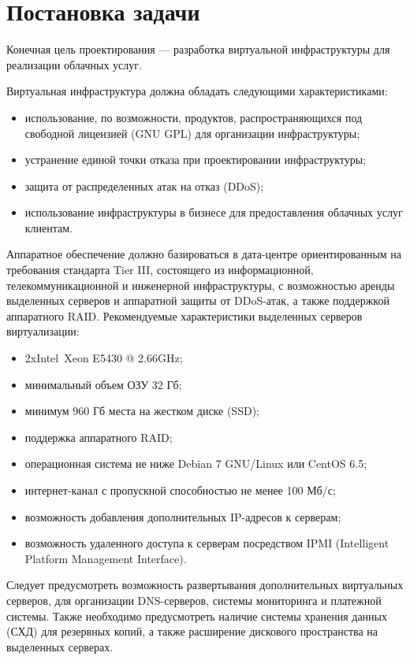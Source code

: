 \section{Постановка задачи}

Конечная цель проектирования --- разработка виртуальной инфраструктуры для реализации облачных услуг.

Виртуальная инфраструктура должна обладать следующими характеристиками:
\begin{itemize}
    \item использование, по возможности, продуктов, распространяющихся под свободной лицензией (GNU GPL) для организации инфраструктуры;
    \item устранение единой точки отказа при проектировании инфраструктуры;
    \item защита от распределенных атак на отказ (DDoS);
    \item использование инфраструктуры в бизнесе для предоставления облачных услуг клиентам.
\end{itemize}

Аппаратное обеспечение должно базироваться в дата-центре ориентированным на требования стандарта Tier III, состоящего из информационной, телекоммуникационной и инженерной инфраструктуры, с возможностью аренды выделенных серверов и аппаратной защиты от DDoS-атак, а также поддержкой аппаратного RAID.
Рекомендуемые характеристики выделенных серверов виртуализации:
\begin{itemize}
    \item 2xIntel\textregistered~Xeon E5430 @ 2.66GHz;
    \item минимальный объем ОЗУ 32 Гб;
    \item минимум 960 Гб места на жестком диске (SSD);
    \item поддержка аппаратного RAID;
    \item операционная система не ниже Debian 7 GNU/Linux или CentOS 6.5;
    \item интернет-канал с пропускной способностью не менее 100 Мб/с;
    \item возможность добавления дополнительных IP-адресов к серверам;
    \item возможность удаленного доступа к серверам посредством IPMI (Intelligent Platform Management Interface).
\end{itemize}

Следует предусмотреть возможность развертывания дополнительных виртуальных серверов, для организации DNS-серверов, системы мониторинга и платежной системы.
Также необходимо предусмотреть наличие системы хранения данных (СХД) для резервных копий, а также расширение дискового пространства на выделенных серверах.

